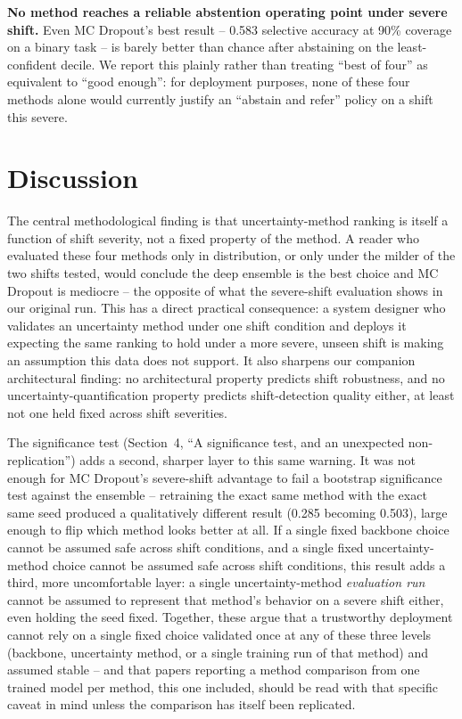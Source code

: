 \documentclass[runningheads]{llncs}
\begin{document}
\textbf{No method reaches a reliable abstention operating point under
severe shift.} Even MC Dropout's best result -- 0.583 selective accuracy
at 90\% coverage on a binary task -- is barely better than chance after
abstaining on the least-confident decile. We report this plainly rather
than treating ``best of four'' as equivalent to ``good enough'': for
deployment purposes, none of these four methods alone would currently
justify an ``abstain and refer'' policy on a shift this severe.

\section{Discussion}

The central methodological finding is that uncertainty-method ranking is
itself a function of shift severity, not a fixed property of the method.
A reader who evaluated these four methods only in distribution, or only
under the milder of the two shifts tested, would conclude the deep
ensemble is the best choice and MC Dropout is mediocre -- the opposite of
what the severe-shift evaluation shows in our original run. This has a
direct practical consequence: a system designer who validates an
uncertainty method under one shift condition and deploys it expecting the
same ranking to hold under a more severe, unseen shift is making an
assumption this data does not support. It also sharpens our companion
architectural finding: no architectural property predicts shift
robustness, and no uncertainty-quantification property predicts
shift-detection quality either, at least not one held fixed across shift
severities.

The significance test (Section~4, ``A significance test, and an
unexpected non-replication'') adds a second, sharper layer to this same
warning. It was not enough for MC Dropout's severe-shift advantage to fail
a bootstrap significance test against the ensemble -- retraining the exact
same method with the exact same seed produced a qualitatively different
result (0.285 becoming 0.503), large enough to flip which method looks
better at all. If a single fixed backbone choice cannot be assumed safe
across shift conditions, and a single fixed uncertainty-method choice
cannot be assumed safe across shift conditions, this result adds a third,
more uncomfortable layer: a single uncertainty-method \emph{evaluation run}
cannot be assumed to represent that method's behavior on a severe shift
either, even holding the seed fixed. Together, these argue that a
trustworthy deployment cannot rely on a single fixed choice validated once
at any of these three levels (backbone, uncertainty method, or a single
training run of that method) and assumed stable -- and that papers
reporting a method comparison from one trained model per method, this one
included, should be read with that specific caveat in mind unless the
comparison has itself been replicated.
\end{document}
